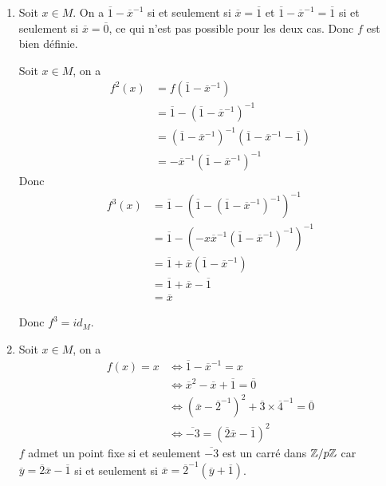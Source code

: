 \begin{solution}
	\phantom{}
	\begin{enumerate}
		\item Soit $x\in M$. On a $\overline{1}-\overline{x}^{-1}$ si et seulement si $\overline{x}=\overline{1}$ et $\overline{1}-\overline{x}^{-1}=\overline{1}$ si et seulement si $\overline{x}=\overline{0}$, ce qui n'est pas possible pour les deux cas. Donc $f$ est bien définie.
		
		Soit $x\in M$, on a 
		\begin{align*}
			f^{2}(x)
			&=f(\overline{1}-\overline{x}^{-1})\\
			&=\overline{1}-(\overline{1}-\overline{x}^{-1})^{-1}\\
			&=(\overline{1}-\overline{x}^{-1})^{-1}(\overline{1}-\overline{x}^{-1}-\overline{1})\\
			&=-\overline{x}^{-1}(\overline{1}-\overline{x}^{-1})^{-1}
		\end{align*}
		Donc 
		\begin{align*}
			f^{3}(x)
			&=\overline{1}-(\overline{1}-(\overline{1}-\overline{x}^{-1})^{-1})^{-1}\\
			&=\overline{1}-(-x\overline{x}^{-1}(\overline{1}-\overline{x}^{-1})^{-1})^{-1}\\
			&=\overline{1}+\overline{x}(\overline{1}-\overline{x}^{-1})\\
			&=\overline{1}+\overline{x}-\overline{1}\\
			&=\overline{x}
		\end{align*}

		Donc $f^{3}=id_{M}$.

		\item Soit $x\in M$, on a 
		\begin{align*}
			f(x)=x
			&\Longleftrightarrow \overline{1}-\overline{x}^{-1}=x\\
			&\Longleftrightarrow \overline{x}^{2}-\overline{x}+\overline{1}=\overline{0}\\
			&\Longleftrightarrow (\overline{x}-\overline{2}^{-1})^{2}+\overline{3}\times\overline{4}^{-1}=\overline{0}\\
			&\Longleftrightarrow \overline{-3}=(\overline{2}\overline{x}-\overline{1})^{2}
		\end{align*}
		$f$ admet un point fixe si et seulement $\overline{-3}$ est un carré dans $\mathbb{Z}/p\mathbb{Z}$ car $\overline{y}=\overline{2}\overline{x}-\overline{1}$ si et seulement si $\overline{x}=\overline{2}^{-1}(\overline{y}+\overline{1})$.


\end{enumerate}
\end{solution}
